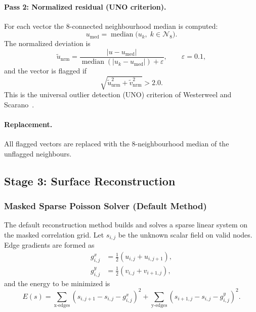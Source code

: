 \documentclass[11pt]{article}
\begin{document}
\paragraph{Pass 2: Normalized residual (UNO criterion).}
For each vector the $8$-connected neighbourhood median is computed:
\begin{equation}
  u_{\mathrm{med}} = \operatorname{median}\!\bigl(u_k,\; k \in \mathcal{N}_8\bigr).
\end{equation}
The normalized deviation is
\begin{equation}
  \tilde{u}_{\mathrm{nrm}} =
    \frac{|u - u_{\mathrm{med}}|}
         {\operatorname{median}(|u_k - u_{\mathrm{med}}|) + \varepsilon},
  \qquad \varepsilon = 0.1,
\end{equation}
and the vector is flagged if
\begin{equation}
  \sqrt{\tilde{u}_{\mathrm{nrm}}^2 + \tilde{v}_{\mathrm{nrm}}^2} > 2.0.
\end{equation}
This is the universal outlier detection (UNO) criterion of Westerweel and
Scarano~\cite{westerweel2005uno}.

\paragraph{Replacement.} All flagged vectors are replaced with the
$8$-neighbourhood median of the unflagged neighbours.

\subsection{Stage 3: Surface Reconstruction}
\label{sec:reconstruction}

\subsubsection{Masked Sparse Poisson Solver (Default Method)}

The default reconstruction method builds and solves a sparse linear system
on the masked correlation grid. Let $s_{i,j}$ be the unknown scalar field on
valid nodes. Edge gradients are formed as
\begin{align}
  g^x_{i,j} &= \tfrac{1}{2}\!\left(u_{i,j} + u_{i,j+1}\right), \\
  g^y_{i,j} &= \tfrac{1}{2}\!\left(v_{i,j} + v_{i+1,j}\right),
\end{align}
and the energy to be minimized is
\begin{equation}
  E(s) =
  \sum_{\text{x-edges}}
    \!\left(s_{i,j+1} - s_{i,j} - g^x_{i,j}\right)^2
  +
  \sum_{\text{y-edges}}
    \!\left(s_{i+1,j} - s_{i,j} - g^y_{i,j}\right)^2.
  \label{eq:poisson_energy}
\end{equation}
\end{document}
